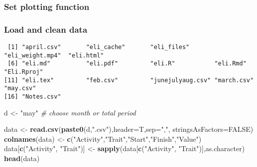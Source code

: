 \documentclass[10,portrait]{article}
\newenvironment{Shaded}{\begin{snugshade}}{\end{snugshade}}
\newcommand{\KeywordTok}[1]{\textcolor[rgb]{0.13,0.29,0.53}{\textbf{#1}}}
\newcommand{\DataTypeTok}[1]{\textcolor[rgb]{0.13,0.29,0.53}{#1}}
\newcommand{\StringTok}[1]{\textcolor[rgb]{0.31,0.60,0.02}{#1}}
\newcommand{\CommentTok}[1]{\textcolor[rgb]{0.56,0.35,0.01}{\textit{#1}}}
\newcommand{\OtherTok}[1]{\textcolor[rgb]{0.56,0.35,0.01}{#1}}
\newcommand{\OperatorTok}[1]{\textcolor[rgb]{0.81,0.36,0.00}{\textbf{#1}}}
\newcommand{\NormalTok}[1]{#1}
\begin{document}
\subsubsection{Set plotting function}\label{set-plotting-function}

\subsubsection{Load and clean data}\label{load-and-clean-data}

\begin{Shaded}
\end{Shaded}

\begin{verbatim}
 [1] "april.csv"       "eli_cache"       "eli_files"       "eli_weight.mp4"  "eli.html"       
 [6] "eli.md"          "eli.pdf"         "eli.R"           "eli.Rmd"         "Eli.Rproj"      
[11] "eli.tex"         "feb.csv"         "junejulyaug.csv" "march.csv"       "may.csv"        
[16] "Notes.csv"      
\end{verbatim}

\begin{Shaded}
\begin{Highlighting}[]
\NormalTok{d <-}\StringTok{ "may"} \CommentTok{# choose month or total period}

\NormalTok{data <-}\StringTok{ }\KeywordTok{read.csv}\NormalTok{(}\KeywordTok{paste0}\NormalTok{(d,}\StringTok{".csv"}\NormalTok{),}\DataTypeTok{header=}\NormalTok{T,}\DataTypeTok{sep=}\StringTok{","}\NormalTok{, }\DataTypeTok{stringsAsFactors=}\OtherTok{FALSE}\NormalTok{)}
\KeywordTok{colnames}\NormalTok{(data) <-}\StringTok{ }\KeywordTok{c}\NormalTok{(}\StringTok{"Activity"}\NormalTok{,}\StringTok{"Trait"}\NormalTok{,}\StringTok{"Start"}\NormalTok{,}\StringTok{"Finish"}\NormalTok{,}\StringTok{"Value"}\NormalTok{)}
\NormalTok{data[}\KeywordTok{c}\NormalTok{(}\StringTok{"Activity"}\NormalTok{, }\StringTok{"Trait"}\NormalTok{)] <-}\StringTok{ }\KeywordTok{sapply}\NormalTok{(data[}\KeywordTok{c}\NormalTok{(}\StringTok{"Activity"}\NormalTok{, }\StringTok{"Trait"}\NormalTok{)],as.character)}
\KeywordTok{head}\NormalTok{(data) }
\end{Highlighting}
\end{Shaded}
\end{document}
